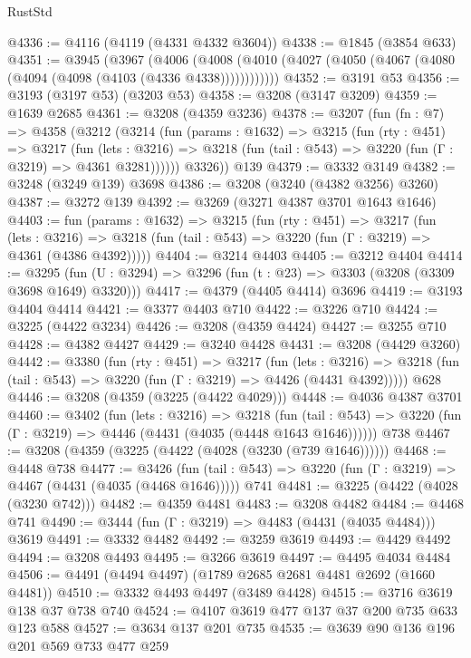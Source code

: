 \begin{lexlean}{RustStd}
\begin{coremodule}
@4336 := @4116 (@4119 (@4331 @4332 @3604))
@4338 := @1845 (@3854 @633)
@4351 := @3945
    (@3967
      (@4006 (@4008 (@4010 (@4027 (@4050 (@4067 (@4080 (@4094 (@4098 (@4103 (@4336 @4338))))))))))))
@4352 := @3191 @53
@4356 := @3193 (@3197 @53) (@3203 @53)
@4358 := @3208 (@3147 @3209)
@4359 := @1639 @2685
@4361 := @3208 (@4359 @3236)
@4378 := @3207
    (fun (fn : @7) =>
    @4358
      (@3212
        (@3214
          (fun (params : @1632) =>
          @3215
            (fun (rty : @451) =>
            @3217
              (fun (lets : @3216) =>
              @3218 (fun (tail : @543) => @3220 (fun (Γ : @3219) => @4361 @3281))))))
        @3326))
    @139
@4379 := @3332 @3149
@4382 := @3248 (@3249 @139) @3698
@4386 := @3208 (@3240 (@4382 @3256) @3260)
@4387 := @3272 @139
@4392 := @3269 (@3271 @4387 @3701 @1643 @1646)
@4403 := fun (params : @1632) =>
  @3215
    (fun (rty : @451) =>
    @3217
      (fun (lets : @3216) =>
      @3218 (fun (tail : @543) => @3220 (fun (Γ : @3219) => @4361 (@4386 @4392)))))
@4404 := @3214 @4403
@4405 := @3212 @4404
@4414 := @3295 (fun (U : @3294) => @3296 (fun (t : @23) => @3303 (@3208 (@3309 @3698 @1649) @3320)))
@4417 := @4379 (@4405 @4414) @3696
@4419 := @3193 @4404 @4414
@4421 := @3377 @4403 @710
@4422 := @3226 @710
@4424 := @3225 (@4422 @3234)
@4426 := @3208 (@4359 @4424)
@4427 := @3255 @710
@4428 := @4382 @4427
@4429 := @3240 @4428
@4431 := @3208 (@4429 @3260)
@4442 := @3380
    (fun (rty : @451) =>
    @3217
      (fun (lets : @3216) =>
      @3218 (fun (tail : @543) => @3220 (fun (Γ : @3219) => @4426 (@4431 @4392)))))
    @628
@4446 := @3208 (@4359 (@3225 (@4422 @4029)))
@4448 := @4036 @4387 @3701
@4460 := @3402
    (fun (lets : @3216) =>
    @3218
      (fun (tail : @543) => @3220 (fun (Γ : @3219) => @4446 (@4431 (@4035 (@4448 @1643 @1646))))))
    @738
@4467 := @3208 (@4359 (@3225 (@4422 (@4028 (@3230 (@739 @1646))))))
@4468 := @4448 @738
@4477 := @3426
    (fun (tail : @543) => @3220 (fun (Γ : @3219) => @4467 (@4431 (@4035 (@4468 @1646)))))
    @741
@4481 := @3225 (@4422 (@4028 (@3230 @742)))
@4482 := @4359 @4481
@4483 := @3208 @4482
@4484 := @4468 @741
@4490 := @3444 (fun (Γ : @3219) => @4483 (@4431 (@4035 @4484))) @3619
@4491 := @3332 @4482
@4492 := @3259 @3619
@4493 := @4429 @4492
@4494 := @3208 @4493
@4495 := @3266 @3619
@4497 := @4495 @4034 @4484
@4506 := @4491 (@4494 @4497) (@1789 @2685 @2681 @4481 @2692 (@1660 @4481))
@4510 := @3332 @4493 @4497 (@3489 @4428)
@4515 := @3716 @3619 @138 @37 @738 @740
@4524 := @4107 @3619 @477 @137 @37 @200 @735 @633 @123 @588
@4527 := @3634 @137 @201 @735
@4535 := @3639 @90 @136 @196 @201 @569 @733 @477 @259

\end{coremodule}
\end{lexlean}

